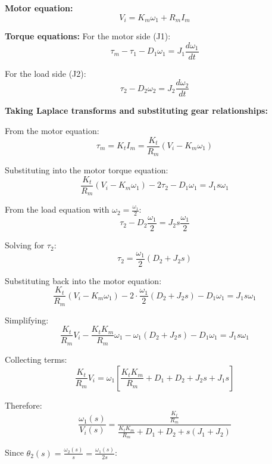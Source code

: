 \documentclass[11pt]{article}
\begin{document}
\textbf{Motor equation:}
\begin{equation}
V_i = K_m \omega_1 + R_m I_m
\end{equation}

\textbf{Torque equations:}
For the motor side (J1):
\begin{equation}
\tau_m - \tau_1 - D_1\omega_1 = J_1 \frac{d\omega_1}{dt}
\end{equation}

For the load side (J2):
\begin{equation}
\tau_2 - D_2\omega_2 = J_2 \frac{d\omega_2}{dt}
\end{equation}

\textbf{Taking Laplace transforms and substituting gear relationships:}

From the motor equation:
\begin{equation}
\tau_m = K_t I_m = \frac{K_t}{R_m}(V_i - K_m \omega_1)
\end{equation}

Substituting into the motor torque equation:
\begin{equation}
\frac{K_t}{R_m}(V_i - K_m \omega_1) - 2\tau_2 - D_1\omega_1 = J_1 s\omega_1
\end{equation}

From the load equation with $\omega_2 = \frac{\omega_1}{2}$:
\begin{equation}
\tau_2 - D_2\frac{\omega_1}{2} = J_2 s\frac{\omega_1}{2}
\end{equation}

Solving for $\tau_2$:
\begin{equation}
\tau_2 = \frac{\omega_1}{2}(D_2 + J_2 s)
\end{equation}

Substituting back into the motor equation:
\begin{equation}
\frac{K_t}{R_m}(V_i - K_m \omega_1) - 2 \cdot \frac{\omega_1}{2}(D_2 + J_2 s) - D_1\omega_1 = J_1 s\omega_1
\end{equation}

Simplifying:
\begin{equation}
\frac{K_t}{R_m}V_i - \frac{K_t K_m}{R_m}\omega_1 - \omega_1(D_2 + J_2 s) - D_1\omega_1 = J_1 s\omega_1
\end{equation}

Collecting terms:
\begin{equation}
\frac{K_t}{R_m}V_i = \omega_1\left[\frac{K_t K_m}{R_m} + D_1 + D_2 + J_2 s + J_1 s\right]
\end{equation}

Therefore:
\begin{equation}
\frac{\omega_1(s)}{V_i(s)} = \frac{\frac{K_t}{R_m}}{\frac{K_t K_m}{R_m} + D_1 + D_2 + s(J_1 + J_2)}
\end{equation}

Since $\theta_2(s) = \frac{\omega_2(s)}{s} = \frac{\omega_1(s)}{2s}$:

\end{document}
